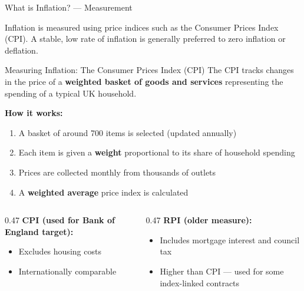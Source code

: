 \documentclass[16pt,aspectratio=169]{beamer}
\begin{document}
\begin{frame}{What is Inflation? --- Measurement}
    \begin{keypoint}
        Inflation is measured using price indices such as the Consumer Prices Index (CPI). A stable, low rate of inflation is generally preferred to zero inflation or deflation.
    \end{keypoint}
\end{frame}

\begin{frame}{Measuring Inflation: The Consumer Prices Index (CPI)}
    The CPI tracks changes in the price of a \textbf{weighted basket of goods and services} representing the spending of a typical UK household.

    \vspace{0.6em}
    \textbf{How it works:}
    \begin{enumerate}
        \item A basket of around 700 items is selected (updated annually)
        \item Each item is given a \textbf{weight} proportional to its share of household spending
        \item Prices are collected monthly from thousands of outlets
        \item A \textbf{weighted average} price index is calculated
    \end{enumerate}

    \vspace{0.5em}
    \begin{columns}
        \begin{column}{0.47\textwidth}
            \textbf{CPI (used for Bank of England target):}
            \begin{itemize}
                \item Excludes housing costs
                \item Internationally comparable
            \end{itemize}
        \end{column}
        \begin{column}{0.47\textwidth}
            \textbf{RPI (older measure):}
            \begin{itemize}
                \item Includes mortgage interest and council tax
                \item Higher than CPI --- used for some index-linked contracts
            \end{itemize}
        \end{column}
    \end{columns}
\end{frame}
\end{document}
